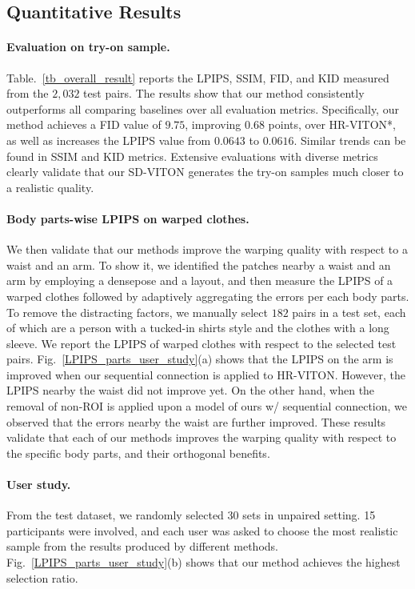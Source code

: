 \documentclass[letterpaper]{article} %
\begin{document}
\subsection{Quantitative Results}

\paragraph{Evaluation on try-on sample.} Table.~\ref{tb_overall_result} reports the LPIPS, SSIM, FID, and KID measured from the $2,032$ test pairs.
The results show that our method consistently outperforms all comparing baselines over all evaluation metrics.
Specifically, our method achieves a FID value of $9.75$, improving $0.68$ points, over HR-VITON*, as well as increases the LPIPS value from $0.0643$ to $0.0616$.
Similar trends can be found in SSIM and KID metrics.
Extensive evaluations with diverse metrics clearly validate that our SD-VITON generates the try-on samples much closer to a realistic quality.

\paragraph{Body parts-wise LPIPS on warped clothes.} We then validate that our methods improve the warping quality with respect to a waist and an arm.
To show it, we identified the patches nearby a waist and an arm by employing a densepose and a layout, and then measure the LPIPS of a warped clothes followed by adaptively aggregating the errors per each body parts.
To remove the distracting factors, we manually select $182$ pairs in a test set, each of which are a person with a tucked-in shirts style and the clothes with a long sleeve.
We report the LPIPS of warped clothes with respect to the selected test pairs.
Fig.~\ref{LPIPS_parts_user_study}(a) shows that the LPIPS on the arm is improved when our sequential connection is applied to HR-VITON.
However, the LPIPS nearby the waist did not improve yet.
On the other hand, when the removal of non-ROI is applied upon a model of ours w/ sequential connection, we observed that the errors nearby the waist are further improved.
These results validate that each of our methods improves the warping quality with respect to the specific body parts, and their orthogonal benefits.

\paragraph{User study.}
From the test dataset, we randomly selected 30 sets in unpaired setting. 15 participants were involved, and each user was asked to choose the most realistic sample from the results produced by different methods. Fig.~\ref{LPIPS_parts_user_study}(b) shows that our method achieves the highest selection ratio. 
\end{document}
